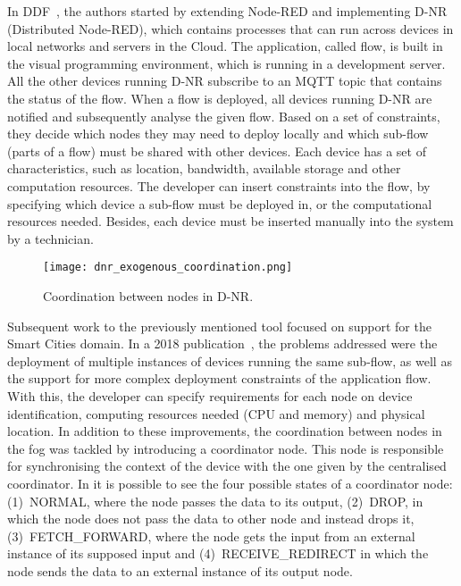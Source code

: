 In DDF~\cite{ddf}, the authors started by extending Node-RED and implementing D-NR (Distributed Node-RED), which contains processes that can run across devices in local networks and servers in the Cloud. The application, called flow, is built in the visual programming environment, which is running in a development server. All the other devices running D-NR subscribe to an MQTT topic that contains the status of the flow. When a flow is deployed, all devices running D-NR are notified and subsequently analyse the given flow. Based on a set of constraints, they decide which nodes they may need to deploy locally and which sub-flow (parts of a flow) must be shared with other devices. Each device has a set of characteristics, such as location, bandwidth, available storage and other computation resources. The developer can insert constraints into the flow, by specifying which device a sub-flow must be deployed in, or the computational resources needed. Besides, each device must be inserted manually into the system by a technician.

\begin{figure}[h]
\centering
\texttt{[image: dnr\_exogenous\_coordination.png]}
\caption[Coordination between nodes in D-NR]{Coordination between nodes in D-NR\cite{fog_at_the_edge}.}\label{fig:coordination_dnr}
\end{figure}

Subsequent work to the previously mentioned tool focused on support for the Smart Cities domain. In a 2018 publication~\cite{fog_at_the_edge}, the problems addressed were the deployment of multiple instances of devices running the same sub-flow, as well as the support for more complex deployment constraints of the application flow. With this, the developer can specify requirements for each node on device identification, computing resources needed (CPU and memory) and physical location. In addition to these improvements, the coordination between nodes in the fog was tackled by introducing a coordinator node. This node is responsible for synchronising the context of the device with the one given by the centralised coordinator. In  it is possible to see the four possible states of a coordinator node: (1)~NORMAL, where the node passes the data to its output, (2)~DROP, in which the node does not pass the data to other node and instead drops it, (3)~FETCH\_FORWARD, where the node gets the input from an external instance of its supposed input and (4)~RECEIVE\_REDIRECT in which the node sends the data to an external instance of its output node.

